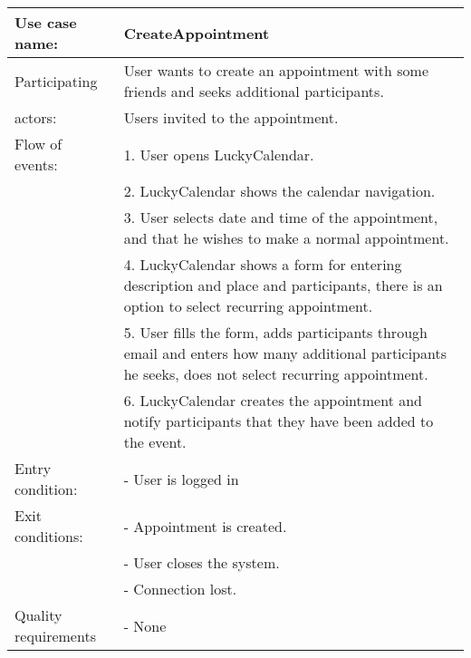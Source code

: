 {\tabulinesep=1.2mm
\begin{tabu}{ | p{3cm} | p{13cm} |}
    \hline
    Use case name: 			& 		CreateAppointment\\ \hline
    Participating  			& 		User wants to create an appointment with some friends and seeks additional participants. \\
    actors:					&		Users invited to the appointment.\\ \hline
    Flow of events: 		& 		1. User opens LuckyCalendar. \\
							&		2. LuckyCalendar shows the calendar navigation.\\
							&		3. User selects date and time of the appointment, and that he wishes to make a normal appointment.\\
							&		4. LuckyCalendar shows a form for entering description and place and participants, there is an option to select recurring appointment.\\
							&		5. User fills the form, adds participants through email and enters how many additional participants he seeks, does not select recurring appointment.\\
							&		6. LuckyCalendar creates the appointment and notify participants that they have been added to the event.\\ \hline
    Entry condition: 		& 		- User is logged in  \\ \hline
	Exit conditions: 		&		- Appointment is created.\\
							&		- User closes the system.\\
							&		- Connection lost.\\\hline
	Quality requirements	&	 	- None \\\hline
\end{tabu}
}
